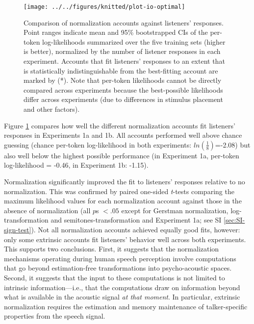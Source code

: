 \documentclass[preprint]{JASA}
\begin{document}
\begin{figure}[!ht]

{\centering \texttt{[image: ../../figures/knitted/plot-io-optimal]} 

}

\caption{Comparison of normalization accounts against listeners' responses. Point ranges indicate mean and 95\% bootstrapped CIs of the per-token log-likelihoods summarized over the five training sets (higher is better), normalized by the number of listener responses in each experiment. Accounts that fit listeners' responses to an extent that is statistically indistinguishable from the best-fitting account are marked by (*). Note that per-token likelihoods cannot be directly compared across experiments because the best-possible likelihoods differ across experiments (due to differences in stimulus placement and other factors).}\label{fig:plot-io-optimal}
\end{figure}

Figure \ref{fig:plot-io-optimal} compares how well the different normalization accounts fit listeners' responses in Experiments 1a and 1b. All accounts performed well above chance guessing (chance per-token log-likelihood in both experiments: \(ln(\frac{1}{8})\)=-2.08) but also well below the highest possible performance (in Experiment 1a, per-token log-likelihood = -0.46, in Experiment 1b: -1.15).

Normalization significantly improved the fit to listeners' responses relative to no normalization. This was confirmed by paired one-sided \emph{t}-tests comparing the maximum likelihood values for each normalization account against those in the absence of normalization (all \(p\)s \(< .05\) except for Gerstman normalization, log-transformation and semitones-transformation and Experiment 1a; see SI \ref{sec:SI-sign-test}). Not all normalization accounts achieved equally good fits, however: only some extrinsic accounts fit listeners' behavior well across both experiments. This supports two conclusions. First, it suggests that the normalization mechanisms operating during human speech perception involve computations that go beyond estimation-free transformations into psycho-acoustic spaces. Second, it suggests that the input to these computations is not limited to intrinsic information---i.e., that the computations draw on information beyond what is available in the acoustic signal \emph{at that moment}. In particular, extrinsic normalization requires the estimation and memory maintenance of talker-specific properties from the speech signal.
\end{document}
